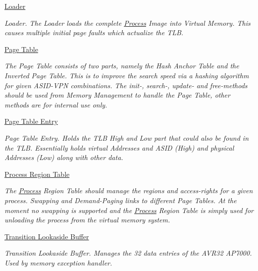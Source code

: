 \begin{CompactItemize}
\item 
\hyperlink{group___v_m_m___l_d_r}{Loader}
\begin{CompactList}\small\item\em Loader. The Loader loads the complete \hyperlink{struct_process}{Process} Image into Virtual Memory. This causes multiple initial page faults which actualize the TLB. \item\end{CompactList}

\item 
\hyperlink{group___v_m_m___p_t}{Page Table}
\begin{CompactList}\small\item\em The Page Table consists of two parts, namely the Hash Anchor Table and the Inverted Page Table. This is to improve the search speed via a hashing algorithm for given ASID-VPN combinations. The init-, search-, update- and free-methods should be used from Memory Management to handle the Page Table, other methods are for internal use only. \item\end{CompactList}

\item 
\hyperlink{group___v_m_m___p_t_e}{Page Table Entry}
\begin{CompactList}\small\item\em Page Table Entry. Holds the TLB High and Low part that could also be found in the TLB. Essentially holds virtual Addresses and ASID (High) and physical Addresses (Low) along with other data. \item\end{CompactList}

\item 
\hyperlink{group___v_m_m___p_r_t}{Process Region Table}
\begin{CompactList}\small\item\em The \hyperlink{struct_process}{Process} Region Table should manage the regions and access-rights for a given process. Swapping and Demand-Paging links to different Page Tables. At the moment no swapping is supported and the \hyperlink{struct_process}{Process} Region Table is simply used for unloading the process from the virtual memory system. \item\end{CompactList}

\item 
\hyperlink{group___v_m_m___t_l_b}{Transition Lookaside Buffer}
\begin{CompactList}\small\item\em Transition Lookaside Buffer. Manages the 32 data entries of the AVR32 AP7000. Used by memory exception handler. \item\end{CompactList}

\end{CompactItemize}
